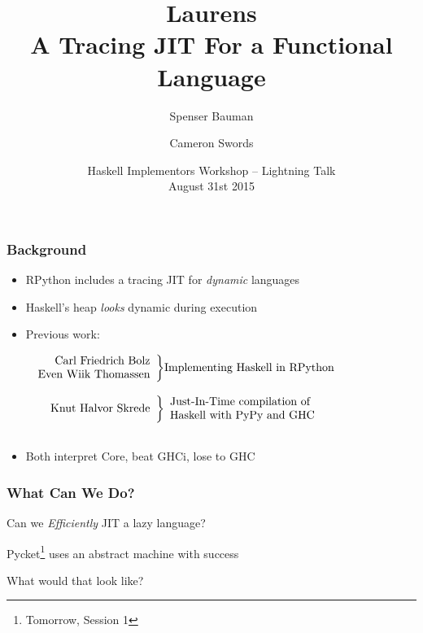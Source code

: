 \documentclass[xetex,serif,mathserif]{beamer}
\title{Laurens \\ {\normalsize A Tracing JIT For a Functional Language} }
\author[shortname]{Spenser Bauman \and Cameron Swords}
\institute[shortinst]{
    Indiana University\\ Bloomington, USA
}
\date{Haskell Implementors Workshop -- Lightning Talk\\ August 31st 2015}
\newenvironment{slide}[1]{\begin{frame}\frametitle{#1}}{\end{frame}}
\begin{document}
\frame{\titlepage}

\begin{slide}{Background}
  \begin{itemize}
    \item RPython includes a tracing JIT for \emph{dynamic} languages
    \item Haskell's heap \emph{looks} dynamic during execution
    \item Previous work:

            \vspace*{1em}
            $\begin{array}{r@{}c@{}l}\begin{array}{r}
            \text{Carl Friedrich Bolz} \\
            \text{Even Wiik Thomassen}\\
            \end{array} & \biggr\}  & \text{Implementing Haskell in RPython}\\\\
            \begin{array}{r}\text{Knut Halvor Skrede}\end{array} & \biggr\} & 
            \begin{array}{l@{}}
            \text{Just-In-Time compilation of}\\
            \text{Haskell with PyPy and GHC}
            \end{array}\\\\
            \end{array}$

    \item Both interpret Core, beat GHCi, lose to GHC
  \end{itemize}
\end{slide}

\begin{slide}{What Can We Do?}

  \begin{center}
  Can we \emph{Efficiently} JIT a lazy language?

  \vspace{3em}

  Pycket\footnote{Tomorrow, Session 1} uses an abstract machine with success

  \vspace{3em}

  What would that look like?
  \end{center}
\end{slide}
\end{document}
